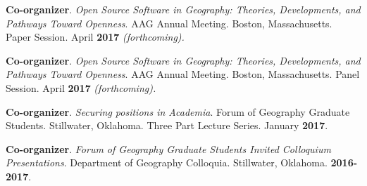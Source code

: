 \begin{cventries}
  \cventry
    {}
    {}
    {}
    {}
    {
       \begin{cvitems}
          \vspace{-3mm}
          \item {\textbf{Co-organizer}. \textit{Open Source Software in
                Geography: Theories, Developments, and Pathways Toward Openness}.
              AAG Annual Meeting. Boston, Massachusetts. Paper Session. April
              \textbf{2017} \textit{(forthcoming).}} 
          \end{cvitems}
          }

  \cventry
    {}
    {}
    {}
    {}
    {
       \begin{cvitems}
          \vspace{-3mm}
          \item {\textbf{Co-organizer}. \textit{Open Source Software in
                Geography: Theories, Developments, and Pathways Toward Openness}.
              AAG Annual Meeting. Boston, Massachusetts. Panel Session. April
              \textbf{2017} \textit{(forthcoming).}} 
          \end{cvitems}
          }

  \cventry
    {}
    {}
    {}
    {}
    {
       \begin{cvitems}
          \vspace{-3mm}
          \item {\textbf{Co-organizer}. \textit{Securing positions in Academia}.
              Forum of Geography Graduate Students. Stillwater, Oklahoma. Three Part Lecture
              Series. January \textbf{2017}.} 
          \end{cvitems}
          }

  \cventry
    {}
    {}
    {}
    {}
    {
       \begin{cvitems}
          \vspace{-3mm}
        \item {\textbf{Co-organizer}. \textit{Forum of Geography Graduate Students Invited
              Colloquium Presentations}. Department of Geography Colloquia.
            Stillwater, Oklahoma. \textbf{2016-2017}.}
          \end{cvitems}
          }

\end{cventries}